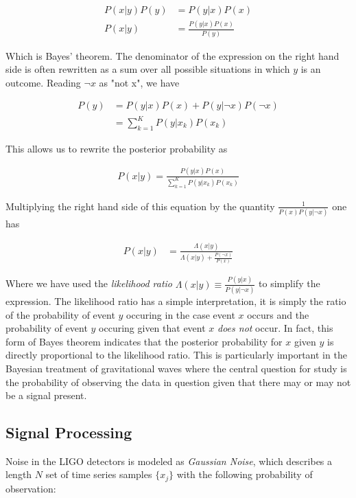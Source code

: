\documentclass[paper=a4, fontsize=11pt]{scrartcl} %
\numberwithin{equation}{section} %
\numberwithin{figure}{section} %
\numberwithin{table}{section} %
\begin{document}
\begin{align} \label{eq:bayes}
P(x|y)P(y) &= P(y|x)P(x) \\
P(x|y) &= \frac{P(y|x)P(x)}{P(y)}
\end{align}

Which is Bayes' theorem. The denominator of the expression on the right hand side is often rewritten as a sum over all possible situations in which $y$ is an outcome. Reading $\neg x$ as "not x", we have

\begin{align}\label{eq:continuous}
P(y) &= P(y|x)P(x) + P(y|\neg x)P(\neg x) \\
&= \sum_{k=1}^K P(y|x_k)P(x_k) 
\end{align}


\clearpage 
This allows us to rewrite the posterior probability as

\begin{align}
P(x|y) = \frac{P(y|x) P(x)}{\sum_{k=1}^K P(y|x_k)P(x_k)}
\end{align}

Multiplying the right hand side of this equation by the quantity $\frac{1}{P(x)P(y|\neg x)}$ one has 

\begin{align} \label{eq:lratio}
P(x|y) &= \frac{\Lambda(x|y)}{\Lambda(x|y) + \frac{P(\neg x)}{P(x)}}
\end{align}

Where we have used the \textit{likelihood ratio} $\Lambda(x|y) \equiv \frac{P(y|x)}{P(y|\neg x)}$ to simplify the expression. The likelihood ratio has a simple interpretation, it is simply the ratio of the probability of event $y$ occuring in the case event $x$ occurs and the probability of event $y$ occuring given that event $x$ \textit{does not} occur. In fact, this form of Bayes theorem indicates that the posterior probability for $x$ given $y$ is directly proportional to the likelihood ratio. This is particularly important in the Bayesian treatment of gravitational waves where the central question for study is the probability of observing the data in question given that there may or may not be a signal present.  

\subsection{Signal Processing}
Noise in the LIGO detectors is modeled as \textit{Gaussian Noise}, which describes a length $N$ set of time series samples $\{x_j\}$ with the following probability of observation:
\end{document}
